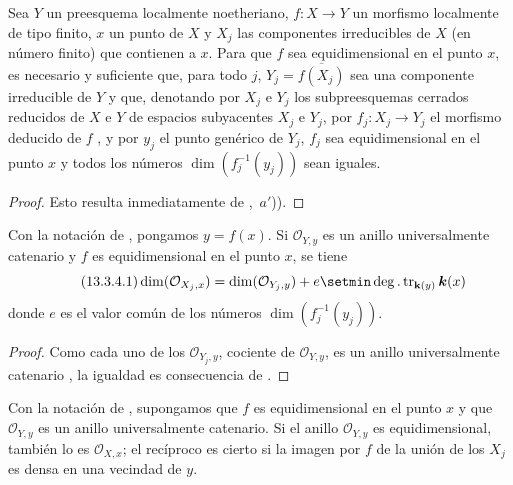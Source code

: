 \begin{proposition}[13.3.3]
\label{IV.13.3.3}
Sea $Y$ un preesquema localmente noetheriano, $f:X\to Y$ un morfismo localmente de tipo finito, $x$ un punto de $X$ y $X_j$ las componentes irreducibles de $X$ (en número finito) que contienen a $x$.
Para que $f$ sea equidimensional en el punto $x$, es necesario y suficiente que, para todo $j$, $Y_j=\overline{f(X_j)}$ sea una componente irreducible de $Y$ y que, denotando por $X_j$ e $Y_j$ los subpreesquemas cerrados reducidos de $X$ e $Y$ de espacios subyacentes $X_j$ e $Y_j$, por $f_j:X_j\to Y_j$ el morfismo deducido de $f$ , y por $y_j$ el punto genérico de $Y_j$, $f_j$ sea equidimensional en el punto $x$ y todos los números $\dim(f_j^{-1}(y_j))$ sean iguales.
\end{proposition}

\begin{proof}
Esto resulta inmediatamente de ,~$a'$)).
\end{proof}

\begin{corollary}[13.3.4]
\label{IV.13.3.4}
Con la notación de , pongamos $y=f(x)$.
Si $\mathcal O_{Y,y}$ es un anillo universalmente catenario y $f$ es equidimensional en el punto $x$, se tiene
\[
\tag{13.3.4.1}
\label{IV.13.3.4.1-fr}
  \dim(\mathcal O_{X_j,x})=\dim(\mathcal O_{Y_j,y})+e
  \setmin\deg.\operatorname{tr}_{\mathbf{k}(y)}\boldsymbol{k}(x)
\]
donde $e$ es el valor común de los números $\dim(f_j^{-1}(y_j))$.
\end{corollary}

\begin{proof}
Como cada uno de los $\mathcal O_{Y_j,y}$, cociente de $\mathcal O_{Y,y}$, es un anillo universalmente catenario , la igualdad es consecuencia de .
\end{proof}

\begin{corollary}[13.3.5]
\label{IV.13.3.5}
Con la notación de , supongamos que $f$ es equidimensional en el punto $x$ y que $\mathcal O_{Y,y}$ es un anillo universalmente catenario.
Si el anillo $\mathcal O_{Y,y}$ es equidimensional, también lo es $\mathcal O_{X,x}$; el recíproco es cierto si la imagen por $f$ de la unión de los $X_j$ es densa en una vecindad de $y$.
\end{corollary}

